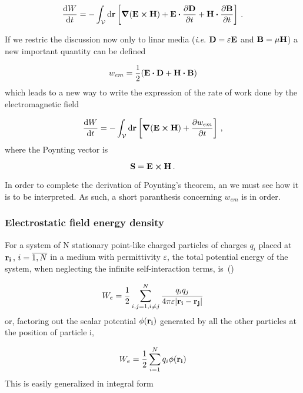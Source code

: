 \documentclass[12pt, class=report, crop=false]{standalone}
\begin{document}
\begin{equation*}
  \dv{W}{t} = - \int_\mathcal{V} \dd{\vb{r}} \left[ \grad{(\vb{E}\cp\vb{H})} + \vb{E}\vdot \pdv{\vb{D}}{t} + \vb{H}\vdot \pdv{\vb{B}}{t} \right] \,.
\end{equation*}

If we restric the discussion now only to linar media (\textit{i}.\textit{e}. \(\vb{D}=\varepsilon \vb{E}\) and \(\vb{B} = \mu \vb{H}\)) a new important quantity can be defined

\begin{equation}
  \label{def:energy-density}
  w_{em} = \frac{1}{2} (\vb{E}\vdot\vb{D}+\vb{H}\vdot\vb{B})
\end{equation}
which leads to a new way to write the expression of the rate of work done by the electromagnetic field

\begin{equation}
  \label{th:poynting-0}
  \dv{W}{t} = - \int_\mathcal{V} \dd{\vb{r}} \left[\grad{(\vb{E}\cp\vb{H})} + \pdv{w_{em}}{t}\right] \,,
\end{equation}
where the Poynting vector is

\begin{equation}
  \label{def:poynting-vector}
  \vb{S}=\vb{E}\cp\vb{H}\,.
\end{equation}

In order to complete the derivation of Poynting's theorem, an we must see how it is to be interpreted. As such, a short paranthesis concerning \( w_{em}\) is in order.

\subsubsection{Electrostatic field energy density}
For a system of N stationary point-like charged particles of charges \(q_{i}\) placed at \(\vb{r_{i}} \,,\,i=\overline{1,N}\) in a medium with permittivity \(\varepsilon\), the total potential energy of the system, when neglecting the infinite self-interaction terms, is~(\cite{jacksonClassicalElectrodynamics1999})

\begin{equation*}
  W_{e} = \frac{1}{2} \sum_{i,j=1, i\neq j}^{N} \frac{q_{i} q_{j}}{4 \pi \varepsilon \abs{\vb{r_{i}}-\vb{r_{j}}}}
\end{equation*}
or, factoring out the scalar potential \(\phi (\vb{r_{i}})\) generated by all the other particles at the position of particle i,

\begin{equation*}
  W_{e} = \frac{1}{2} \sum_{i=1}^{N} q_{i} \phi (\vb{r_{i}})
\end{equation*}
This is easily generalized in integral form
\end{document}

